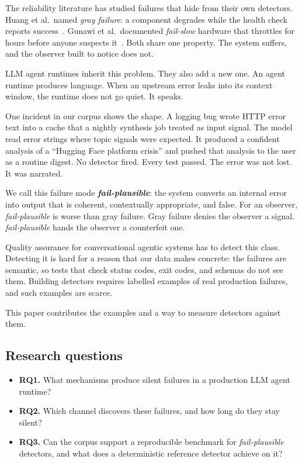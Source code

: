\documentclass[conference]{IEEEtran}
\newcommand{\failplausible}{\emph{fail-plausible}}
\begin{document}
The reliability literature has studied failures that hide from their own
detectors. Huang et al.\ named \emph{gray failure}: a component degrades
while the health check reports success~\cite{huang2017gray}. Gunawi et al.\
documented \emph{fail-slow} hardware that throttles for hours before anyone
suspects it~\cite{gunawi2018failslow}. Both share one property. The system
suffers, and the observer built to notice does not.

LLM agent runtimes inherit this problem. They also add a new one. An agent
runtime produces language. When an upstream error leaks into its context
window, the runtime does not go quiet. It speaks.

One incident in our corpus shows the shape. A logging bug wrote HTTP error
text into a cache that a nightly synthesis job treated as input signal. The
model read error strings where topic signals were expected. It produced a
confident analysis of a ``Hugging Face platform crisis'' and pushed that
analysis to the user as a routine digest. No detector fired. Every test
passed. The error was not lost. It was narrated.

We call this failure mode \textbf{\failplausible{}}: the system converts an
internal error into output that is coherent, contextually appropriate, and
false. For an observer, \failplausible{} is worse than gray failure. Gray
failure denies the observer a signal. \failplausible{} hands the observer a
counterfeit one.

Quality assurance for conversational agentic systems has to detect this
class. Detecting it is hard for a reason that our data makes concrete: the
failures are semantic, so tests that check status codes, exit codes, and
schemas do not see them. Building detectors requires labelled examples of
real production failures, and such examples are scarce.

This paper contributes the examples and a way to measure detectors against
them.

\subsection{Research questions}

\begin{itemize}
  \item \textbf{RQ1.} What mechanisms produce silent failures in a
        production LLM agent runtime?
  \item \textbf{RQ2.} Which channel discovers these failures, and how long
        do they stay silent?
  \item \textbf{RQ3.} Can the corpus support a reproducible benchmark for
        \failplausible{} detectors, and what does a deterministic reference
        detector achieve on it?
\end{itemize}
\end{document}
